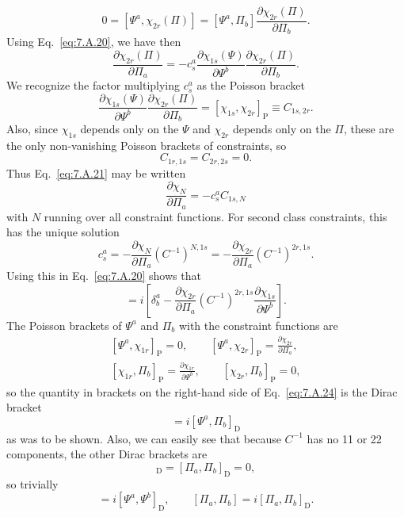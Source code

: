 \[
  0=[\Psi^a,\chi_{2r}(\Pi)]
  =[\Psi^a,\Pi_b]\frac{\partial\chi_{2r}(\Pi)}{\partial\Pi_b}.
\]
Using Eq.~\eqref{eq:7.A.20}, we have then
\begin{equation}
  \frac{\partial\chi_{2r}(\Pi)}{\partial\Pi_a}
  =-c^a_s\frac{\partial\chi_{1s}(\Psi)}{\partial\Psi^b}
    \frac{\partial\chi_{2r}(\Pi)}{\partial\Pi_b}.
  \tag{7.A.21}\label{eq:7.A.21}
\end{equation}
We recognize the factor multiplying $c^a_s$ as the Poisson bracket
\[
  \frac{\partial\chi_{1s}(\Psi)}{\partial\Psi^b}
  \frac{\partial\chi_{2r}(\Pi)}{\partial\Pi_b}
  =[\chi_{1s},\chi_{2r}]_{\mathrm P}\equiv C_{1s,2r}.
\]
Also, since $\chi_{1s}$ depends only on the $\Psi$ and $\chi_{2r}$ depends
only on the $\Pi$, these are the only non-vanishing Poisson brackets of
constraints, so
\[
  C_{1r,1s}=C_{2r,2s}=0.
\]
Thus Eq.~\eqref{eq:7.A.21} may be written
\begin{equation}
  \frac{\partial\chi_N}{\partial\Pi_a}=-c^a_s C_{1s,N}
  \tag{7.A.22}\label{eq:7.A.22}
\end{equation}
with $N$ running over all constraint functions. For second class constraints,
this has the unique solution
\begin{equation}
  c^a_s=-\frac{\partial\chi_N}{\partial\Pi_a}(C^{-1})^{N,1s}
  =-\frac{\partial\chi_{2r}}{\partial\Pi_a}(C^{-1})^{2r,1s}.
  \tag{7.A.23}\label{eq:7.A.23}
\end{equation}
Using this in Eq.~\eqref{eq:7.A.20} shows that
\begin{equation}
  [\Psi^a,\Pi_b]
  =i\left[\delta^a_b
  -\frac{\partial\chi_{2r}}{\partial\Pi_a}(C^{-1})^{2r,1s}
   \frac{\partial\chi_{1s}}{\partial\Psi^b}\right].
  \tag{7.A.24}\label{eq:7.A.24}
\end{equation}
The Poisson brackets of $\Psi^a$ and $\Pi_b$ with the constraint functions are
\begin{equation}
  \begin{gathered}
    [\Psi^a,\chi_{1r}]_{\mathrm P}=0,
    \qquad
    [\Psi^a,\chi_{2r}]_{\mathrm P}
    =\frac{\partial\chi_{2r}}{\partial\Pi_a},\\
    [\chi_{1r},\Pi_b]_{\mathrm P}
    =\frac{\partial\chi_{1r}}{\partial\Psi^b},
    \qquad
    [\chi_{2r},\Pi_b]_{\mathrm P}=0,
  \end{gathered}
  \tag{7.A.25}\label{eq:7.A.25}
\end{equation}
so the quantity in brackets on the right-hand side of Eq.~\eqref{eq:7.A.24} is the
Dirac bracket
\begin{equation}
  [\Psi^a,\Pi_b]=i[\Psi^a,\Pi_b]_{\mathrm D}
  \tag{7.A.26}\label{eq:7.A.26}
\end{equation}
as was to be shown. Also, we can easily see that because $C^{-1}$ has no 11
or 22 components, the other Dirac brackets are
\begin{equation}
  [\Psi^a,\Psi^b]_{\mathrm D}=[\Pi_a,\Pi_b]_{\mathrm D}=0,
  \tag{7.A.27}\label{eq:7.A.27}
\end{equation}
so trivially
\begin{equation}
  [\Psi^a,\Psi^b]=i[\Psi^a,\Psi^b]_{\mathrm D},
  \qquad
  [\Pi_a,\Pi_b]=i[\Pi_a,\Pi_b]_{\mathrm D}.
  \tag{7.A.28}\label{eq:7.A.28}
\end{equation}


